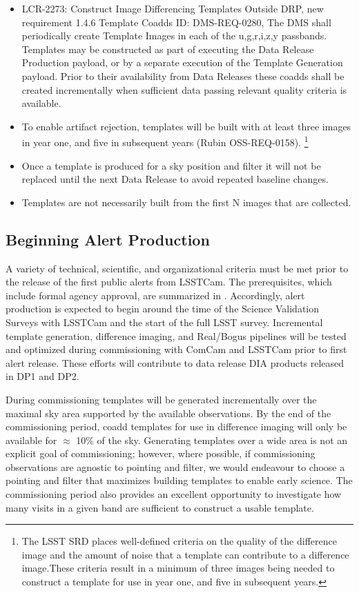\begin{itemize}
\item LCR-2273: Construct Image Differencing Templates Outside DRP, new requirement 1.4.6 Template Coadds ID: DMS-REQ-0280, The DMS shall periodically create Template Images in each of the u,g,r,i,z,y passbands. Templates may be constructed as part of executing the Data Release Production payload, or by a separate execution of the Template Generation payload. Prior to their availability from Data Releases these coadds shall be created incrementally when sufficient data passing relevant quality criteria is available.
\item To enable artifact rejection, templates will be built with at least three images in year one, and five in subsequent years (Rubin OSS-REQ-0158). \footnote{The LSST SRD places well-defined criteria on the quality of the difference image and the amount of noise that a template can contribute to a difference image.These criteria result in a minimum of three images being needed to construct a template for use in year one, and five in subsequent years.}
\item Once a template is produced for a sky position and filter it will not be replaced until the next Data Release to avoid repeated baseline changes.
\item Templates are not necessarily built from the first N images that are collected.
\end{itemize}


\subsection{Beginning Alert Production}

A variety of technical, scientific, and organizational criteria must be met prior to the release of the first public alerts from LSSTCam.
The prerequisites, which include formal agency approval, are summarized in .
Accordingly, alert production is expected to begin around the time of the Science Validation Surveys with LSSTCam and the start of the full LSST survey.
Incremental template generation, difference imaging, and Real/Bogus pipelines will be tested and optimized during commissioning with ComCam and LSSTCam prior to first alert release.
These efforts will contribute to data release DIA products released in DP1 and DP2.

During commissioning templates will be generated incrementally over the maximal sky area supported by the available observations.
By the end of the commissioning period, coadd templates for use in difference imaging will only be available for $\approx$ 10\% of the sky.
Generating templates over a wide area is not an explicit goal of commissioning;  however, where possible, if commissioning observations are agnostic to pointing and filter, we would endeavour to choose a pointing and filter that maximizes building templates to enable early science.
The commissioning period also provides an excellent opportunity to investigate how many visits in a given band are sufficient to construct a usable template.


